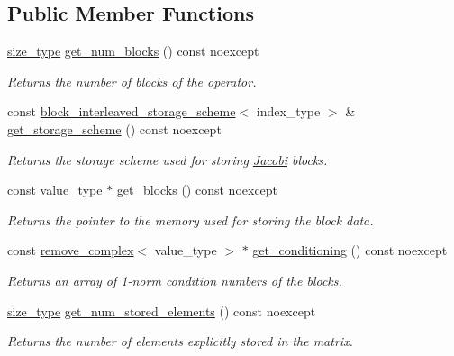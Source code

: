 \subsection*{Public Member Functions}
\begin{DoxyCompactItemize}
\item 
\hyperlink{namespacegko_a6e5c95df0ae4e47aab2f604a22d98ee7}{size\+\_\+type} \hyperlink{classgko_1_1preconditioner_1_1Jacobi_afb44d8e560f00f65c46c6813638ce24c}{get\+\_\+num\+\_\+blocks} () const noexcept
\begin{DoxyCompactList}\small\item\em Returns the number of blocks of the operator. \end{DoxyCompactList}\item 
const \hyperlink{structgko_1_1preconditioner_1_1block__interleaved__storage__scheme}{block\+\_\+interleaved\+\_\+storage\+\_\+scheme}$<$ index\+\_\+type $>$ \& \hyperlink{classgko_1_1preconditioner_1_1Jacobi_a5e4e792eebc837d555c2df4c74a3d5dc}{get\+\_\+storage\+\_\+scheme} () const noexcept
\begin{DoxyCompactList}\small\item\em Returns the storage scheme used for storing \hyperlink{classgko_1_1preconditioner_1_1Jacobi}{Jacobi} blocks. \end{DoxyCompactList}\item 
const value\+\_\+type $\ast$ \hyperlink{classgko_1_1preconditioner_1_1Jacobi_a1f3104ff10b00ff5faaf17a164400663}{get\+\_\+blocks} () const noexcept
\begin{DoxyCompactList}\small\item\em Returns the pointer to the memory used for storing the block data. \end{DoxyCompactList}\item 
const \hyperlink{namespacegko_adfcb75c44f6b6c701989419c166f6e7e}{remove\+\_\+complex}$<$ value\+\_\+type $>$ $\ast$ \hyperlink{classgko_1_1preconditioner_1_1Jacobi_ad4cef85a520076fefc0e911ab205cf12}{get\+\_\+conditioning} () const noexcept
\begin{DoxyCompactList}\small\item\em Returns an array of 1-\/norm condition numbers of the blocks. \end{DoxyCompactList}\item 
\hyperlink{namespacegko_a6e5c95df0ae4e47aab2f604a22d98ee7}{size\+\_\+type} \hyperlink{classgko_1_1preconditioner_1_1Jacobi_af238130016f4534089edfb95918f14d1}{get\+\_\+num\+\_\+stored\+\_\+elements} () const noexcept
\begin{DoxyCompactList}\small\item\em Returns the number of elements explicitly stored in the matrix. \end{DoxyCompactList}\item 

\end{DoxyCompactItemize}
